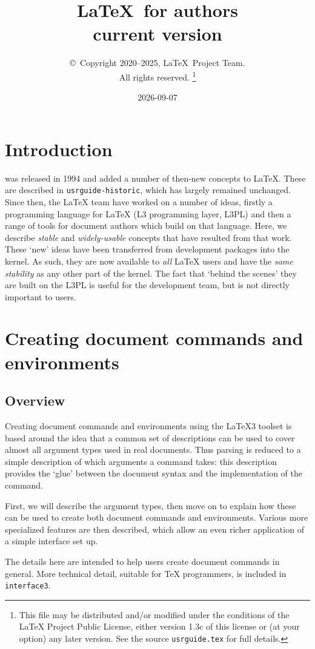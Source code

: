 \documentclass{ltxguide}
\title{\LaTeX\ for authors\\ current version}
\author{\copyright~Copyright 2020--2025, \LaTeX\ Project Team.\\
   All rights reserved.%
   \footnote{This file may be distributed and/or modified under the
     conditions of the \LaTeX{} Project Public License, either version 1.3c
     of this license or (at your option) any later version. See the source
    \texttt{usrguide.tex} for full details.}%
}
\date{2026-09-07}
\begin{document}
\maketitle

\tableofcontents

\section{Introduction}

\LaTeXe{} was released in 1994 and added a number of then-new concepts to
\LaTeX{}. These are described in \texttt{usrguide-historic}, which has largely remained
unchanged. Since then, the \LaTeX{} team have worked on a number of ideas,
firstly a programming language for \LaTeX{} (L3 programming layer, L3PL) and then a range of
tools for document authors which build on that language. Here, we describe
\emph{stable} and \emph{widely-usable} concepts that have resulted from that
work. These `new' ideas have been transferred from development packages
into the \LaTeXe{} kernel. As such, they are now available to \emph{all}
\LaTeX{} users and have the \emph{same stability} as any other part of the
kernel. The fact that `behind the scenes' they are built on the L3PL
is useful for the development team, but is not directly important to users.

\section{Creating document commands and environments}

\subsection{Overview}

Creating document commands and environments using the \LaTeX3 toolset is based
around the idea that a common set of descriptions can be used to cover almost
all argument types used in real documents. Thus parsing is reduced to a simple
description of which arguments a command takes: this description provides the
`glue' between the document syntax and the implementation of the
command.

First, we will describe the argument types, then move on to explain how these
can be used to create both document commands and environments. Various more
specialized features are then described, which allow an even richer application
of a simple interface set up.

The details here are intended to help users create document commands in
general. More technical detail, suitable for \TeX{} programmers, is included
in \texttt{interface3}.
\end{document}
